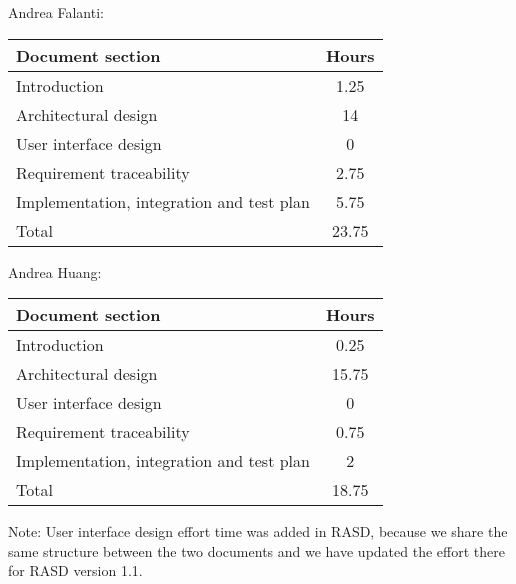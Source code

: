 Andrea Falanti:

\begin{tabular}{|l|c|}
    \hline
    Document section & Hours \\
    \hline
     Introduction & 1.25\\
     Architectural design & 14\\
     User interface design & 0\\
     Requirement traceability & 2.75\\
     Implementation, integration and test plan & 5.75\\
     \hline
     Total & 23.75\\
     \hline
\end{tabular}
\vskip 0.3in

Andrea Huang:

\begin{tabular}{|l|c|}
    \hline
    Document section & Hours \\
    \hline
     Introduction & 0.25\\
     Architectural design & 15.75\\
     User interface design & 0\\
     Requirement traceability & 0.75\\
     Implementation, integration and test plan & 2\\
     \hline
     Total & 18.75\\
     \hline
\end{tabular}

\bigskip
\bigskip
Note: User interface design effort time was added in RASD, because we share the same structure between the two documents and we have updated the effort there for RASD version 1.1. 
